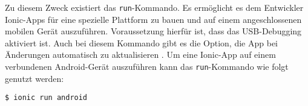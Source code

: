 Zu diesem Zweck existiert das \texttt{run}-Kommando. Es ermöglicht es dem Entwickler Ionic-Apps für eine spezielle Plattform zu bauen und auf einem angeschlossenen mobilen Gerät auszuführen. Voraussetzung hierfür ist, dass das USB-Debugging aktiviert ist. Auch bei diesem Kommando gibt es die Option, die App bei Änderungen automatisch zu aktualisieren \cite{ionic:run}. Um eine Ionic-App auf einem verbundenen Android-Gerät auszuführen kann das \texttt{run}-Kommando wie folgt genutzt werden:
\begin{codebox}
\begin{lstlisting}[style=typescript]
$ ionic run android
\end{lstlisting}
\end{codebox}